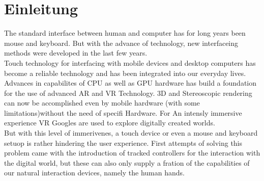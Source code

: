 \chapter{Einleitung}
The standard interface between human and computer has for long years been mouse and keyboard. But with the advance of technology, new interfaceing methods were developed in the last few years.\\
Touch technology for interfacing with mobile devices and desktop computers has become a reliable technology and has been integrated into our everyday lives.
Advances in  capabilites of CPU as well as GPU hardware has build a foundation for the use of advanced AR and VR Technology. 3D and Stereoscopic rendering can now be accomplished even by mobile hardware (with some limitations)without the need of specifi Hardware. For An intensly immersive experience VR Googles are used to explore digitally created worlds.\\
But with this level of immerivenes, a touch device or even a mouse and keyboard setuop is rather hindering the user experience. First attempts of solving this problem came with the introduction of tracked controllers for the interaction with the digital world, but these can also only supply a fration of the capabilities of our natural interaction devices, namely the human hands.\\